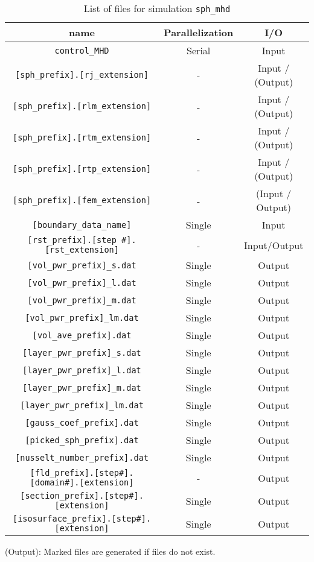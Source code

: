 \begin{table}[htp]
\caption{List of files for simulation {\tt sph\_mhd} }
\begin{center} 
\begin{tabular}{|c|c|c|}
\hline
 name & Parallelization & I/O \\ \hline \hline
\verb|control_MHD| & Serial & Input \\ \hline
\verb|[sph_prefix].[rj_extension]|  & - & Input / (Output) \\
\verb|[sph_prefix].[rlm_extension]| & - & Input / (Output) \\
\verb|[sph_prefix].[rtm_extension]| & - & Input / (Output) \\
\verb|[sph_prefix].[rtp_extension]| & - & Input / (Output) \\ \hline
\verb|[sph_prefix].[fem_extension]| & - & (Input / Output) \\ \hline
\verb|[boundary_data_name]| & Single & Input \\ \hline
\verb|[rst_prefix].[step #].[rst_extension]| &  - & Input/Output  \\ \hline
\verb|[vol_pwr_prefix]_s.dat| & Single & Output \\ \hline
\verb|[vol_pwr_prefix]_l.dat| & Single & Output \\
\verb|[vol_pwr_prefix]_m.dat| & Single & Output \\
\verb|[vol_pwr_prefix]_lm.dat| & Single & Output \\
\verb|[vol_ave_prefix].dat| & Single & Output \\ \hline
\verb|[layer_pwr_prefix]_s.dat| & Single & Output \\
\verb|[layer_pwr_prefix]_l.dat| & Single & Output \\
\verb|[layer_pwr_prefix]_m.dat| & Single & Output \\
\verb|[layer_pwr_prefix]_lm.dat| & Single & Output \\ \hline
\verb|[gauss_coef_prefix].dat| & Single & Output   \\
\verb|[picked_sph_prefix].dat| & Single & Output   \\ \hline
\verb|[nusselt_number_prefix].dat| & Single & Output   \\ \hline
\verb|[fld_prefix].[step#].[domain#].[extension]| &  - & Output  \\ \hline
\verb|[section_prefix].[step#].[extension]| &  Single & Output  \\
\verb|[isosurface_prefix].[step#].[extension]| &  Single & Output  \\ \hline
\end{tabular}
\end{center}
(Output): Marked files are generated if files do not exist.
\label{table:sph_mhd}
\end{table}
